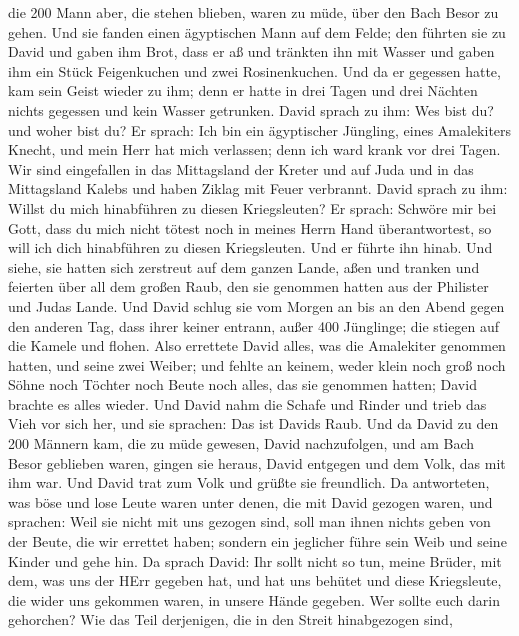 die 200 Mann aber, die stehen blieben, waren zu müde, über den Bach
Besor zu gehen.  Und sie fanden einen ägyptischen Mann auf
dem Felde; den führten sie zu David und gaben ihm Brot, dass er aß und
tränkten ihn mit Wasser  und gaben ihm ein Stück
Feigenkuchen und zwei Rosinenkuchen. Und da er gegessen hatte, kam sein
Geist wieder zu ihm; denn er hatte in drei Tagen und drei Nächten nichts
gegessen und kein Wasser getrunken.  David sprach zu ihm:
Wes bist du? und woher bist du? Er sprach: Ich bin ein ägyptischer
Jüngling, eines Amalekiters Knecht, und mein Herr hat mich verlassen;
denn ich ward krank vor drei Tagen.  Wir sind eingefallen
in das Mittagsland der Kreter und auf Juda und in das Mittagsland Kalebs
und haben Ziklag mit Feuer verbrannt.  David sprach zu ihm:
Willst du mich hinabführen zu diesen Kriegsleuten? Er sprach: Schwöre
mir bei Gott, dass du mich nicht tötest noch in meines Herrn Hand
überantwortest, so will ich dich hinabführen zu diesen Kriegsleuten.
 Und er führte ihn hinab. Und siehe, sie hatten sich
zerstreut auf dem ganzen Lande, aßen und tranken und feierten über all
dem großen Raub, den sie genommen hatten aus der Philister und Judas
Lande.  Und David schlug sie vom Morgen an bis an den Abend
gegen den anderen Tag, dass ihrer keiner entrann, außer 400 Jünglinge;
die stiegen auf die Kamele und flohen.  Also errettete
David alles, was die Amalekiter genommen hatten, und seine zwei Weiber;
 und fehlte an keinem, weder klein noch groß noch Söhne
noch Töchter noch Beute noch alles, das sie genommen hatten; David
brachte es alles wieder.  Und David nahm die Schafe und
Rinder und trieb das Vieh vor sich her, und sie sprachen: Das ist Davids
Raub.  Und da David zu den 200 Männern kam, die zu müde
gewesen, David nachzufolgen, und am Bach Besor geblieben waren, gingen
sie heraus, David entgegen und dem Volk, das mit ihm war. Und David trat
zum Volk und grüßte sie freundlich.  Da antworteten, was
böse und lose Leute waren unter denen, die mit David gezogen waren, und
sprachen: Weil sie nicht mit uns gezogen sind, soll man ihnen nichts
geben von der Beute, die wir errettet haben; sondern ein jeglicher führe
sein Weib und seine Kinder und gehe hin.  Da sprach David:
Ihr sollt nicht so tun, meine Brüder, mit dem, was uns der HErr gegeben
hat, und hat uns behütet und diese Kriegsleute, die wider uns gekommen
waren, in unsere Hände gegeben.  Wer sollte euch darin
gehorchen? Wie das Teil derjenigen, die in den Streit hinabgezogen sind,
